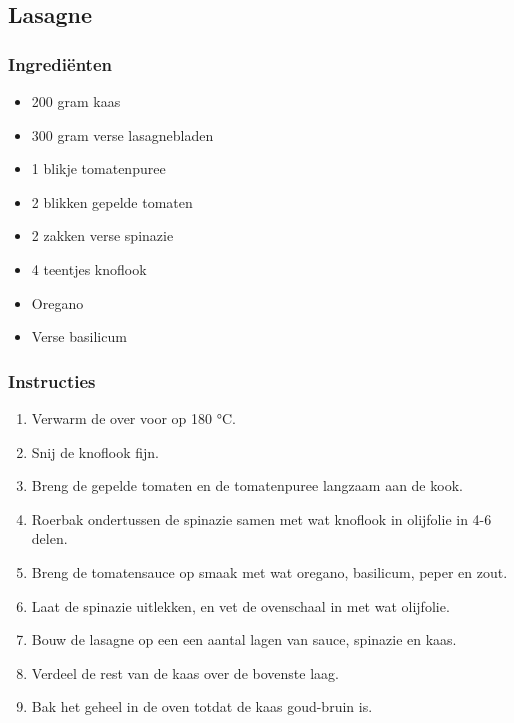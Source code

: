 \subsection{Lasagne}
\subsubsection*{Ingrediënten}
\begin{multicols}{2}
    \begin{itemize}
        \item 200 gram kaas
        \item 300 gram verse lasagnebladen
        \item 1 blikje tomatenpuree
        \item 2 blikken gepelde tomaten
        \item 2 zakken verse spinazie
        \item 4 teentjes knoflook
        \item Oregano
        \item Verse basilicum
    \end{itemize}
\end{multicols}

\subsubsection*{Instructies}
\begin{multicols}{2}
    \begin{enumerate}
        \item Verwarm de over voor op 180 °C.
        \item Snij de knoflook fijn.
        \item Breng de gepelde tomaten en de tomatenpuree langzaam aan de kook.
        \item Roerbak ondertussen de spinazie samen met wat knoflook in olijfolie in 4-6 delen.
        \item Breng de tomatensauce op smaak met wat oregano, basilicum, peper en zout.
        \item Laat de spinazie uitlekken, en vet de ovenschaal in met wat olijfolie.
        \item Bouw de lasagne op een een aantal lagen van sauce, spinazie en kaas.
        \item Verdeel de rest van de kaas over de bovenste laag.
        \item Bak het geheel in de oven totdat de kaas goud-bruin is.
    \end{enumerate}
\end{multicols}